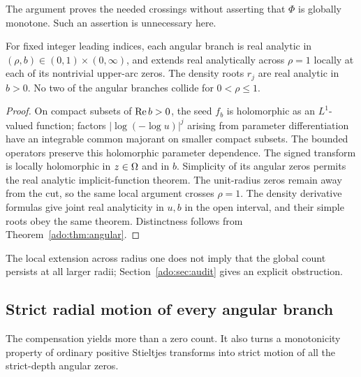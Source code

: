 The argument proves the needed crossings without asserting that
$\Phi$ is globally monotone. Such an assertion is unnecessary here.

\begin{corollary}
\label{ado:cor:analyticbranches}
For fixed integer leading indices, each angular branch is real analytic
in $(\rho,b)\in(0,1)\times(0,\infty)$, and extends real analytically
across $\rho=1$ locally at each of its nontrivial upper-arc zeros.
The density roots $r_j$ are real analytic in $b>0$. No two of the
angular branches collide for $0<\rho\le1$.
\end{corollary}
\begin{proof}
On compact subsets of $\operatorname{Re} b>0$, the seed $f_b$ is holomorphic as
an $L^1$-valued function; factors $|\log(-\log u)|^j$ arising from
parameter differentiation have an integrable common majorant on smaller
compact subsets. The bounded operators preserve this holomorphic
parameter dependence. The signed transform is locally holomorphic in
$z\in\Omega$ and in $b$. Simplicity of its angular zeros permits the
real analytic implicit-function theorem. The unit-radius zeros remain
away from the cut, so the same local argument crosses $\rho=1$.
The density derivative formulas give joint real analyticity in $u,b$
in the open interval, and their simple roots obey the same theorem.
Distinctness follows from Theorem~\ref{ado:thm:angular}.
\end{proof}
The local extension across radius one does not imply that the global
count persists at all larger radii; Section~\ref{ado:sec:audit} gives
an explicit obstruction.

\subsection{Strict radial motion of every angular branch}
The compensation yields more than a zero count. It also turns a
monotonicity property of ordinary positive Stieltjes transforms into
strict motion of all the strict-depth angular zeros.

